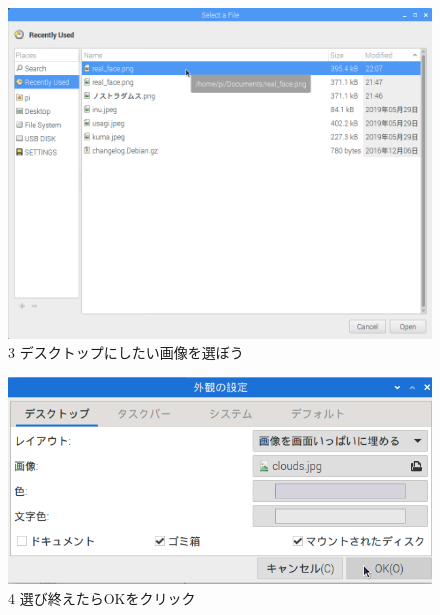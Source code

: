\documentclass[a4paper,12pt]{jarticle}
\begin{document}
\begin{figure}
\begin{minipage}{\textwidth}
    \begin{minipage}{0.45\textwidth}
      \includegraphics[width=0.85\linewidth]{textbook-img110.png}\\
      3 デスクトップにしたい画像を選ぼう
    \end{minipage}
    \begin{minipage}{2.582cm}
    \end{minipage}
    \begin{minipage}{0.45\textwidth}
      \includegraphics[width=0.85\linewidth]{textbook-img109.png}\\
      4 選び終えたらOKをクリック
    \end{minipage}

  \end{minipage}

  \bigskip



\end{figure}
\end{document}
